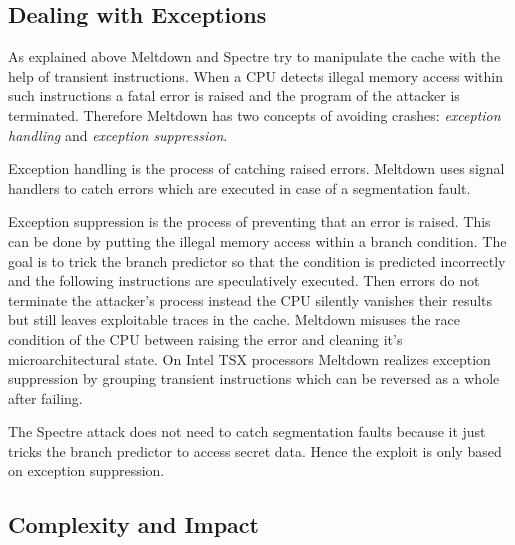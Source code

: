 \documentclass[a4paper,oneside,openright] {scrreprt}
\begin{document}
\subsection{Dealing with Exceptions}
\label{ch:intro:motivation:A}

As explained above Meltdown and Spectre try to manipulate the cache with the help of transient instructions. 
When a CPU detects illegal memory access within such instructions a fatal error is raised and the program of the attacker
is terminated. Therefore Meltdown has two concepts of avoiding crashes: \textit{exception handling} and \textit{exception suppression}.

Exception handling is the process of catching raised errors. Meltdown uses signal handlers to catch errors
which are executed in case of a segmentation fault.

Exception suppression is the process of preventing that an error is raised. This can be done by putting the illegal memory access
within a branch condition. The goal is to trick the branch predictor so that the condition is predicted incorrectly and the following
instructions are speculatively executed.
Then errors do not terminate the attacker's process instead the CPU silently vanishes their results
 but still leaves exploitable traces in the cache.
Meltdown misuses the race condition of the CPU between raising the error and cleaning it's microarchitectural state. On Intel TSX processors Meltdown realizes exception suppression by grouping transient instructions which can be
 reversed as a whole after failing.

The Spectre attack does not need to catch segmentation faults because it just tricks the branch predictor to access secret data. 
Hence the exploit is only based on exception suppression.

\subsection{Complexity and Impact}
\label{ch:intro:motivation:A}
\end{document}
